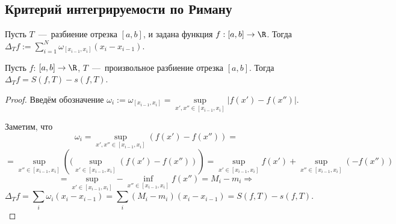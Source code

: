 \subsection{Критерий интегрируемости по Риману}
\begin{definition}
    Пусть $T$~---~разбиение отрезка $[a, b]$, и задана функция $f: [a, b] \rightarrow \R$. Тогда $\Delta_T f:= \sum\limits_{i = 1}^N \omega_{[x_{i - 1}, x_i]} (x_i - x_{i - 1})$.
\end{definition}

\begin{lemma}
    \hypertarget{lemma13.1}{Пусть $f$: $[a, b] \rightarrow \R$, $T$~---~произвольное разбиение отрезка $[a, b]$. Тогда $\Delta_Tf = S(f, T) - s(f, T)$.}
\end{lemma}
\begin{proof}
    Введём обозначение $\omega_i := \omega_{[x_{i - 1}, x_i]} = \sup\limits_{x', x'' \in [x_{i - 1}, x_i]}|f(x') - f(x'')|$. 
    
    Заметим, что 
    $$\omega_i = \sup\limits_{x', x'' \in [x_{i - 1}, x_i]} \left(f(x') - f(x'')\right) =$$
    \[= \sup\limits_{x'' \in [x_{i - 1}, x_i]}\left( (\sup\limits_{x' \in [x_{i - 1}, x_i]} \left(f(x') - f(x'')\right) \right) = \sup\limits_{x' \in [x_{i - 1}, x_i]} f(x') + \sup\limits_{x'' \in [x_{i - 1}, x_i]} (-f(x'')) \]
    \[= \sup\limits_{x' \in [x_{i - 1}, x_i]} - \inf\limits_{x'' \in [x_{i - 1}, x_i]} f(x'') = M_i - m_i \Rightarrow\]
    \[\Delta_T f = \sum\limits_{i} \omega_i(x_i - x_{i - 1}) = \sum\limits_i (M_i - m_i)(x_i - x_{i - 1}) = S(f, T) - s(f, T).\]
\end{proof}

